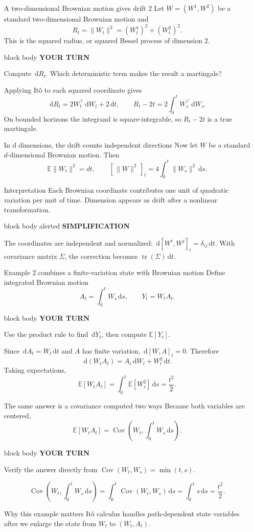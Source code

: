 \documentclass[handout,10pt,aspectratio=169]{beamer}
\newenvironment{simplificationbox}{%
  \begin{beamercolorbox}[rounded=true,sep=0.7em,wd=\textwidth]{block body alerted}
  \textbf{\color{CourseRed}SIMPLIFICATION}\quad
}{\end{beamercolorbox}}
\newenvironment{pausebox}{%
  \begin{beamercolorbox}[rounded=true,sep=0.8em,wd=\textwidth]{block body}
  \textbf{\color{CourseGold}YOUR TURN}\quad
}{\end{beamercolorbox}}
\newcommand{\dd}{\,\mathrm d}
\newcommand{\E}{\mathbb E}
\newcommand{\1}{\mathbf 1}
\DeclareMathOperator{\Cov}{Cov}
\begin{document}
\begin{frame}{A two-dimensional Brownian motion gives drift 2}
Let \(W=(W^1,W^2)\) be a standard two-dimensional Brownian motion and
\[
R_t=\|W_t\|^2=(W_t^1)^2+(W_t^2)^2.
\]
This is the squared radius, or squared Bessel process of dimension 2.
\begin{pausebox}
Compute \(\dd R_t\). Which deterministic term makes the result a martingale?
\end{pausebox}

Applying It\^o to each squared coordinate gives
\[
\boxed{\dd R_t=2W_t^\top\dd W_t+2\dd t,}
\qquad
\boxed{R_t-2t=2\int_0^tW_s^\top\dd W_s.}
\]
On bounded horizons the integrand is square-integrable, so \(R_t-2t\) is a
true martingale.
\end{frame}

\begin{frame}{In d dimensions, the drift counts independent directions}
Now let \(W\) be a standard \(d\)-dimensional Brownian motion. Then
\[
\E\|W_t\|^2=dt,
\qquad
[\,\|W\|^2\,]_t=4\int_0^t\|W_s\|^2\dd s.
\]
\begin{exampleblock}{Interpretation}
Each Brownian coordinate contributes one unit of quadratic variation per unit
of time. Dimension appears as drift after a nonlinear transformation.
\end{exampleblock}
\begin{simplificationbox}
The coordinates are independent and normalized:
\(\dd[W^i,W^j]_t=\delta_{ij}\dd t\). With covariance matrix \(\Sigma\), the
correction becomes \(\operatorname{tr}(\Sigma)\dd t\).
\end{simplificationbox}
\end{frame}

\begin{frame}{Example 2 combines a finite-variation state with Brownian motion}
Define integrated Brownian motion
\[
A_t=\int_0^tW_s\dd s,
\qquad Y_t=W_tA_t.
\]
\begin{pausebox}
Use the product rule to find \(\dd Y_t\), then compute \(\E[Y_t]\).
\end{pausebox}

Since \(\dd A_t=W_t\dd t\) and \(A\) has finite variation,
\(\dd[W,A]_t=0\). Therefore
\[
\boxed{\dd(W_tA_t)=A_t\dd W_t+W_t^2\dd t.}
\]
Taking expectations,
\[
\boxed{\E[W_tA_t]=\int_0^t\E[W_s^2]\dd s=\frac{t^2}{2}.}
\]
\end{frame}

\begin{frame}{The same answer is a covariance computed two ways}
Because both variables are centered,
\[
\E[W_tA_t]=\Cov\left(W_t,\int_0^tW_s\dd s\right).
\]
\begin{pausebox}
Verify the answer directly from \(\Cov(W_t,W_s)=\min(t,s)\).
\end{pausebox}

\[
\Cov\left(W_t,\int_0^tW_s\dd s\right)
=\int_0^t\Cov(W_t,W_s)\dd s
=\int_0^t s\dd s
=\frac{t^2}{2}.
\]
\begin{block}{Why this example matters}
It\^o calculus handles path-dependent state variables after we enlarge the
state from \(W_t\) to \((W_t,A_t)\).
\end{block}
\end{frame}
\end{document}
